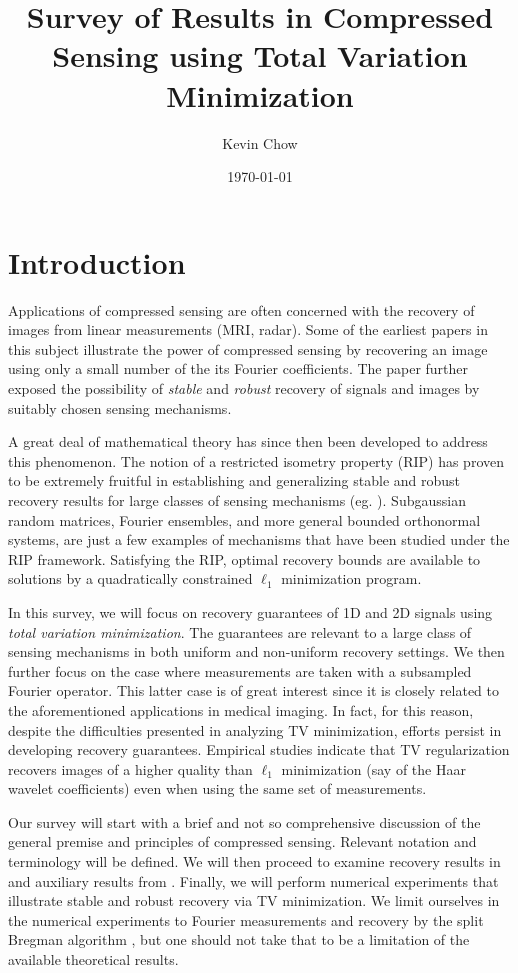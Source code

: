 \documentclass[11pt, oneside]{article}   %
\title{Survey of Results in Compressed Sensing using Total Variation 
Minimization}
\author{Kevin Chow}
\date{\today}		%
\begin{document}
\maketitle

\section{Introduction}
Applications of compressed sensing are often concerned with the recovery of 
images from linear measurements (MRI, radar).  Some of the earliest papers in 
this subject \cite{candes2006stable, candes2006robust} illustrate the power of 
compressed sensing by recovering an image using only a small number of the 
its Fourier coefficients. The paper \cite{candes2006stable} further 
exposed the possibility of \textit{stable} and \textit{robust} recovery of 
signals and images by suitably chosen sensing mechanisms. 

A great deal of mathematical theory has since then been developed to 
address this phenomenon. The notion of a restricted isometry property (RIP) has proven to be extremely fruitful in establishing and generalizing stable and  robust recovery results for large classes of sensing mechanisms (eg. \cite{candes2006stable, foucart2013mathematical}).
Subgaussian random matrices, Fourier ensembles, and more general bounded orthonormal systems, are just a few examples of mechanisms that have been studied under the RIP framework. Satisfying the RIP, optimal recovery bounds are available to solutions by a quadratically constrained $\ell_1$ minimization program.

In this survey, we will focus on recovery guarantees of 1D and 2D signals using \textit{total variation minimization}. 
The guarantees are relevant to a large class of sensing mechanisms in
both uniform and non-uniform recovery settings. We then further 
focus on the case where measurements are taken with a subsampled Fourier 
operator. This latter case is of great interest since it is closely related to
the aforementioned applications in medical imaging. In fact, for this reason, despite the difficulties presented in analyzing TV minimization, efforts persist in developing recovery guarantees. Empirical studies indicate that TV regularization recovers images of a higher quality than $\ell_1$ minimization (say of the Haar wavelet coefficients) even when using the same set of measurements.

Our survey will start with a brief and not so comprehensive discussion of the 
general premise and principles of compressed sensing. Relevant notation and 
terminology will be defined. We will then proceed to examine
recovery results in \cite{needell2013stable, needell2013near, poon2015tv} and 
auxiliary results from \cite{krahmer2012stable, candes2006robust}. Finally, 
we will perform numerical experiments that illustrate stable and robust recovery 
via TV minimization. We limit ourselves in the numerical experiments to Fourier 
measurements and recovery by the split Bregman algorithm 
\cite{goldstein2009split, goldsteinsplitcode}, but one should not take that to 
be a limitation of the available theoretical results.
\end{document}

